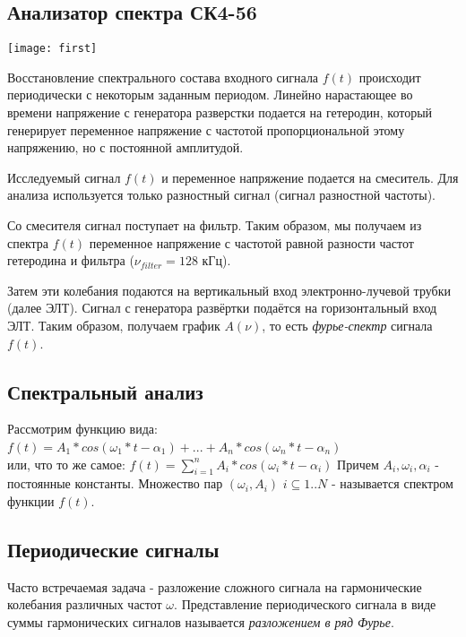 \documentclass[a4paper,12pt]{article}
\begin{document}
\subsection{Анализатор спектра СК4-56}
\graphicspath{{{pictures/}}}
\texttt{[image: first]}

Восстановление спектрального состава входного сигнала $f(t)$ происходит периодически с некоторым заданным периодом. Линейно нарастающее во времени напряжение с генератора разверстки подается на гетеродин, который генерирует переменное напряжение с частотой пропорциональной этому напряжению, но с постоянной амплитудой.

Исследуемый сигнал $f(t)$ и переменное напряжение подается на смеситель. Для анализа используется только разностный сигнал (сигнал разностной частоты). 

Со смесителя сигнал поступает на фильтр. Таким образом, мы получаем из спектра $f(t)$ переменное напряжение с частотой равной разности частот гетеродина и фильтра ($\nu_{filter}=128$ кГц).

Затем эти колебания подаются на вертикальный вход электронно-лучевой трубки (далее ЭЛТ). Сигнал с генератора развёртки подаётся на горизонтальный вход ЭЛТ. Таким образом, получаем график $A(\nu)$, то есть {\it{фурье-спектр}} сигнала $f(t)$.


\subsection{Спектральный анализ}

Рассмотрим функцию вида: \\
$f(t) = A_{1}*cos(\omega_1*t-\alpha_{1}) + ... + A_{n}*cos(\omega_{n}*t-\alpha_{n})$ \ \\
или, что то же самое:
$f(t) = \sum\limits_{i=1}^n A_{i}*cos(\omega_{i}*t-\alpha_{i})$
\newpage
Причем $A_{i}, \omega_{i}, \alpha_{i}$ - постоянные константы. Множество пар $(\omega_{i}, A_{i})$  $i \subseteq 1..N$ - называется спектром функции $f(t)$.
\ \\
\subsection{Периодические сигналы}


Часто встречаемая задача - разложение сложного сигнала на гармонические колебания различных частот $\omega$. Представление периодического сигнала в виде суммы гармонических сигналов называется {\it{разложением в ряд Фурье}}.
\end{document}
